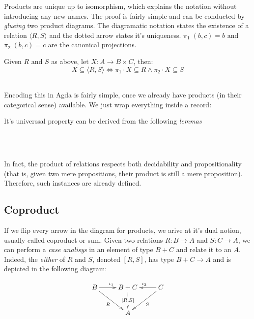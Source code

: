 Products are unique up to isomorphism, which explains the notation without introducing any new names.
The proof is fairly simple and can be conducted by \emph{glueing} two product diagrams.
The diagramatic notation states the existence of a relation $\langle R , S \rangle$ and the dotted arrow
states it's uniqueness. $\pi_1\;(b , c) = b$ and $\pi_2\;(b , c) = c$ are the canonical
projections.\\

\begin{mydef}
Given $R$ and $S$ as above, let $X : A \rightarrow B \times C$, then:
\[
  X \subseteq \langle R , S \rangle \Leftrightarrow \pi_1 \cdot X \subseteq R \wedge \pi_2 \cdot X \subseteq S
\]\\
\end{mydef}
Encoding this in Agda is fairly simple, once we already have products (in their categorical sense)
available. We just wrap everything inside a record:


It's universsal property can be derived from the following \emph{lemmas}

\\
\\

In fact, the product of relations respects both decidability and propositionality (that is,
given two mere propositions, their product is still a mere proposition). Therefore, such 
instances are already defined.

\subsection{Coproduct}

If we flip every arrow in the diagram for products, we arive at it's dual notion, usually
called coproduct or sum. Given two relations $R : B \rightarrow A$ and $S : C \rightarrow A$,
we can perform a \emph{case analisys} in an element of type $B + C$ and relate it to an $A$.
Indeed, the \emph{either} of $R$ and $S$, denoted $[R , S]$, has type $B + C \rightarrow A$
and is depicted in the following diagram:

\begin{displaymath}
\xymatrix{%
 B \ar[r]^{\iota_1} \ar[dr]_{R} & B + C \ar@{..>}[d]|{[R , S]} & C \ar[l]_{\iota_2} \ar[dl]^{S} \\
   &   A   &
}
\end{displaymath}

